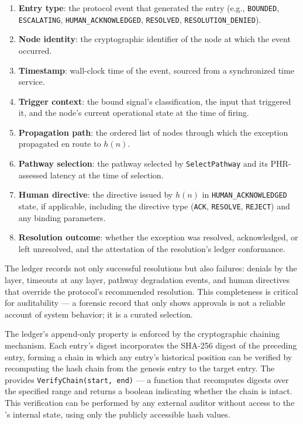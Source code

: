 \begin{enumerate}
\item \textbf{Entry type}: the protocol event that generated the entry (e.g., \texttt{BOUNDED}, \texttt{ESCALATING}, \texttt{HUMAN\_ACKNOWLEDGED}, \texttt{RESOLVED}, \texttt{RESOLUTION\_DENIED}).
\item \textbf{Node identity}: the cryptographic identifier of the node at which the event occurred.
\item \textbf{Timestamp}: wall-clock time of the event, sourced from a synchronized time service.
\item \textbf{Trigger context}: the bound signal's classification, the input that triggered it, and the node's current operational state at the time of firing.
\item \textbf{Propagation path}: the ordered list of nodes through which the exception propagated en route to $h(n)$.
\item \textbf{Pathway selection}: the pathway selected by \texttt{SelectPathway} and its PHR-assessed latency at the time of selection.
\item \textbf{Human directive}: the directive issued by $h(n)$ in \texttt{HUMAN\_ACKNOWLEDGED} state, if applicable, including the directive type (\texttt{ACK}, \texttt{RESOLVE}, \texttt{REJECT}) and any binding parameters.
\item \textbf{Resolution outcome}: whether the exception was resolved, acknowledged, or left unresolved, and the \fact{} attestation of the resolution's ledger conformance.
\end{enumerate}

The ledger records not only successful resolutions but also failures: denials by the \fact{} layer, timeouts at any layer, pathway degradation events, and human directives that override the protocol's recommended resolution. This completeness is critical for auditability — a forensic record that only shows approvals is not a reliable account of system behavior; it is a curated selection.

The ledger's append-only property is enforced by the cryptographic chaining mechanism. Each entry's digest incorporates the SHA-256 digest of the preceding entry, forming a chain in which any entry's historical position can be verified by recomputing the hash chain from the genesis entry to the target entry. The \fact{} provides \texttt{VerifyChain(start, end)} — a function that recomputes digests over the specified range and returns a boolean indicating whether the chain is intact. This verification can be performed by any external auditor without access to the \fact{}'s internal state, using only the publicly accessible hash values.

